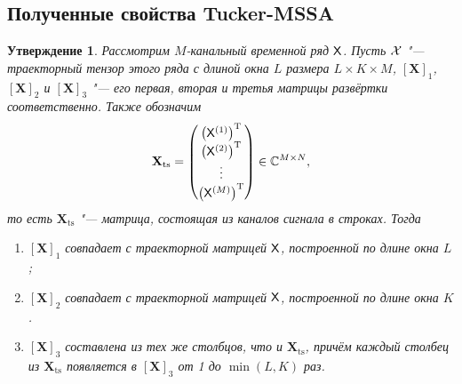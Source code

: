 \documentclass[specialist,
  substylefile = spbu.rtx,
subf,href,colorlinks=true, 12pt]{disser}
\theoremstyle{plain}
\newtheorem{statement}{Утверждение}[section]
\theoremstyle{definition}
\theoremstyle{remark}
\def\tmssa/{Tucker-MSSA}
\begin{document}
\subsection{Полученные свойства \tmssa/}
\begin{statement}\label{state:traj-mssa-mat-to-tens}
  Рассмотрим $M$-канальный временной ряд $\mathsf{X}$. Пусть $\mathcal{X}$ "---
  траекторный тензор этого ряда с длиной окна $L$ размера $L \times
  K \times M$,
  $\left[\mathbf{X}\right]_1$, $\left[\mathbf{X}\right]_2$ и
  $\left[\mathbf{X}\right]_3$ "--- его
  первая, вторая и третья матрицы развёртки соответственно. Также обозначим
  \begin{equation*}
    \mathbf{X}_{\text{ts}} =
    \begin{pmatrix}
      \left(\mathsf{X}^{(1)}\right)^{\mathrm{T}}\\
      \left(\mathsf{X}^{(2)}\right)^{\mathrm{T}}\\
      \vdots\\
      \left(\mathsf{X}^{(M)}\right)^{\mathrm{T}}
    \end{pmatrix} \in\mathbb{C}^{M \times N},
  \end{equation*}
  то есть $\mathbf{X}_{\text{ts}}$ "--- матрица, состоящая из каналов
  сигнала в строках.
  Тогда
  \begin{enumerate}
    \item $\left[\mathbf{X}\right]_1$ совпадает с траекторной матрицей
      $\mathsf{X}$, построенной по длине окна $L$;
    \item $\left[\mathbf{X}\right]_2$ совпадает с траекторной матрицей
      $\mathsf{X}$, построенной по длине окна $K$.
    \item $\left[\mathbf{X}\right]_3$ составлена из тех же столбцов,
      что и $\mathbf{X}_{\text{ts}}$, причём каждый столбец из
      $\mathbf{X}_{\text{ts}}$ появляется в
      $\left[\mathbf{X}\right]_3$ от 1 до $\min(L, K)$ раз.
  \end{enumerate}
\end{statement}
\end{document}
